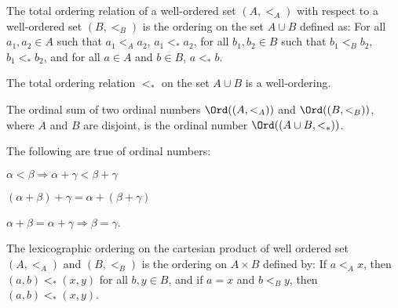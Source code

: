 \documentclass[crop=false,class=book,oneside]{standalone}
\begin{document}
             \begin{definition}
                The total ordering relation of a
                well-ordered set $(A,<_{A})$ with respect
                to a well-ordered set $(B,<_{B})$ is the ordering
                on the set ${A}\cup{B}$ defined as: For all
                $a_{1},a_{2}\in{A}$ such that $a_{1}<_{A}a_{2}$,
                $a_{1}<_{*}a_{2}$, for all $b_{1},b_{2}\in{B}$
                such that $b_{1}<_{B}b_{2}$, $b_{1}<_{*}b_{2}$,
                and for all ${a}\in{A}$ and ${b}\in{B}$,
                ${a}<_{*}{b}$.
             \end{definition}
             \begin{theorem*}
                The total ordering relation $<_{*}$ on the set
                ${A}\cup{B}$ is a well-ordering.
             \end{theorem*}
             \begin{definition}
                The ordinal sum of two ordinal numbers
                $\Ord((A,<_{A}))$ and $\Ord((B,<_{B}))$,
                where $A$ and $B$ are disjoint,
                is the ordinal number
                $\Ord(({A}\cup{B},<_{*}))$.
             \end{definition}
             \begin{theorem*}
                The following are true of ordinal numbers:
                \begin{enumerate}
                    \begin{multicols}{3}
                        \item $\alpha<\beta\Rightarrow%
                               \alpha+\gamma<\beta+\gamma$
                        \item $(\alpha+\beta)+\gamma%
                               =\alpha+(\beta+\gamma)$
                        \item $\alpha+\beta=\alpha+\gamma%
                               \Rightarrow\beta=\gamma$.
                    \end{multicols}
                \end{enumerate}
             \end{theorem*}
             \begin{definition}
                The lexicographic ordering on the cartesian
                product of well ordered set $(A,<_{A})$ and
                $(B,<_{B})$ is the ordering on
                ${A}\times{B}$ defined by: If ${a}<_{A}{x}$,
                then $(a,b)<_{*}(x,y)$ for all $b,y\in{B}$, and
                if $a=x$ and $b<_{B}y$, then $(a,b)<_{*}(x,y)$.
             \end{definition}
\end{document}
